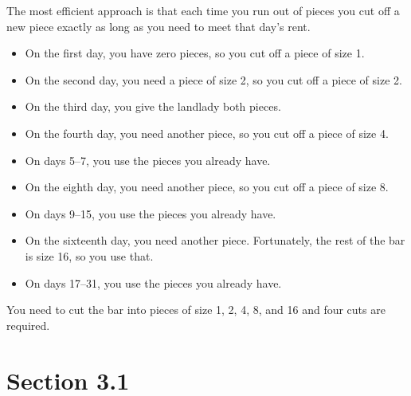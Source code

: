 \documentclass[letterpaper]{exam}
\begin{document}
  \begin{solution}

      The most efficient approach is that each time you run out of pieces
      you cut off a new piece exactly as long as you need to meet that
      day's rent.  

      \begin{itemize}
          \item On the first day, you have zero pieces, so you cut off a piece of size 1.  
          \item On the second day, you need a piece of size 2, so you cut off a piece of size 2.
          \item On the third day, you give the landlady both pieces.
          \item On the fourth day, you need another piece, so you cut off a piece of size 4.
          \item On days 5--7, you use the pieces you already have.
          \item On the eighth day, you need another piece, so you cut off a piece of size 8.
          \item On days 9--15, you use the pieces you already have.
          \item On the sixteenth day, you need another piece.  Fortunately, the rest of the bar is size 16, so you use that.
          \item On days 17--31, you use the pieces you already have.
      \end{itemize}

      You need to cut the bar into pieces of size 1, 2, 4, 8, and 16 and four cuts are required.

  \end{solution}
  \ifprintanswers{}

      \section{Section 3.1} 
\end{document}
